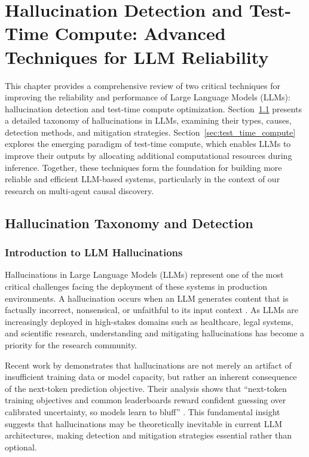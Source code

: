 \chapter{Hallucination Detection and Test-Time Compute: Advanced Techniques for LLM Reliability}
\label{Chapter:HallucinationTestTime}

This chapter provides a comprehensive review of two critical techniques for improving the reliability and performance of Large Language Models (LLMs): hallucination detection and test-time compute optimization. Section~\ref{sec:hallucination_taxonomy} presents a detailed taxonomy of hallucinations in LLMs, examining their types, causes, detection methods, and mitigation strategies. Section~\ref{sec:test_time_compute} explores the emerging paradigm of test-time compute, which enables LLMs to improve their outputs by allocating additional computational resources during inference. Together, these techniques form the foundation for building more reliable and efficient LLM-based systems, particularly in the context of our research on multi-agent causal discovery.

\section{Hallucination Taxonomy and Detection}
\label{sec:hallucination_taxonomy}

\subsection{Introduction to LLM Hallucinations}

Hallucinations in Large Language Models (LLMs) represent one of the most critical challenges facing the deployment of these systems in production environments. A hallucination occurs when an LLM generates content that is factually incorrect, nonsensical, or unfaithful to its input context \citep{huang2023survey,ji2023survey}. As LLMs are increasingly deployed in high-stakes domains such as healthcare, legal systems, and scientific research, understanding and mitigating hallucinations has become a priority for the research community.

Recent work by \citet{openai2025bluffing} demonstrates that hallucinations are not merely an artifact of insufficient training data or model capacity, but rather an inherent consequence of the next-token prediction objective. Their analysis shows that ``next-token training objectives and common leaderboards reward confident guessing over calibrated uncertainty, so models learn to bluff'' \citep{openai2025bluffing}. This fundamental insight suggests that hallucinations may be theoretically inevitable in current LLM architectures, making detection and mitigation strategies essential rather than optional.


